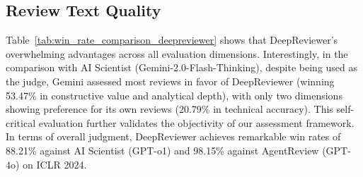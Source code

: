 \documentclass{article}
\begin{document}


\subsection{Review Text Quality}



Table~\ref{tab:win_rate_comparison_deepreviewer} shows that DeepReviewer's overwhelming advantages across all evaluation dimensions. Interestingly, in the comparison with AI Scientist (Gemini-2.0-Flash-Thinking), despite being used as the judge, Gemini assessed most reviews in favor of DeepReviewer (winning 53.47\% in constructive value and analytical depth), with only two dimensions showing preference for its own reviews (20.79\% in technical accuracy). This self-critical evaluation further validates the objectivity of our assessment framework. In terms of overall judgment, DeepReviewer achieves remarkable win rates of 88.21\% against AI Scientist (GPT-o1) and 98.15\% against AgentReview (GPT-4o) on ICLR 2024.
\end{document}
